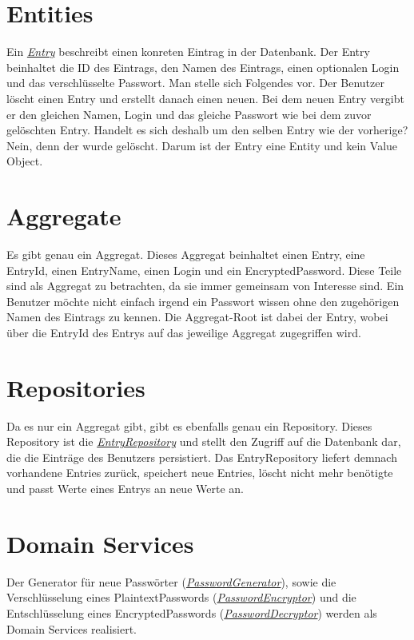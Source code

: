 \section{Entities}
Ein \href{https://github.com/moorts/Morik/blob/main/src/application/DDD/Entry.h}{\textit{Entry}} beschreibt einen konreten Eintrag in der Datenbank. Der Entry beinhaltet die ID des Eintrags, den Namen des Eintrags, einen optionalen Login und das verschlüsselte Passwort. Man stelle sich Folgendes vor. Der Benutzer löscht einen Entry und erstellt danach einen neuen. Bei dem neuen Entry vergibt er den gleichen Namen, Login und das gleiche Passwort wie bei dem zuvor gelöschten Entry. Handelt es sich deshalb um den selben Entry wie der vorherige? Nein, denn der wurde gelöscht. Darum ist der Entry eine Entity und kein Value Object.

\section{Aggregate}
Es gibt genau ein Aggregat. Dieses Aggregat beinhaltet einen Entry, eine EntryId, einen EntryName, einen Login und ein EncryptedPassword. Diese Teile sind als Aggregat zu betrachten, da sie immer gemeinsam von Interesse sind. Ein Benutzer möchte nicht einfach irgend ein Passwort wissen ohne den zugehörigen Namen des Eintrags zu kennen. Die Aggregat-Root ist dabei der Entry, wobei über die EntryId des Entrys auf das jeweilige Aggregat zugegriffen wird.

\section{Repositories}
Da es nur ein Aggregat gibt, gibt es ebenfalls genau ein Repository. Dieses Repository ist die \href{https://github.com/moorts/Morik/blob/main/src/application/DDD/EntryRepository.h}{\textit{EntryRepository}} und stellt den Zugriff auf die Datenbank dar, die die Einträge des Benutzers persistiert. Das EntryRepository liefert demnach vorhandene Entries zurück, speichert neue Entries, löscht nicht mehr benötigte und passt Werte eines Entrys an neue Werte an.

\section{Domain Services}
Der Generator für neue Passwörter (\href{https://github.com/moorts/Morik/blob/main/src/application/DDD/PasswordGenerator.h}{\textit{PasswordGenerator}}), sowie die Verschlüsselung eines PlaintextPasswords (\href{https://github.com/moorts/Morik/blob/main/src/application/DDD/PasswordEncryption.h#L11}{\textit{PasswordEncryptor}}) und die Entschlüsselung eines EncryptedPasswords (\href{https://github.com/moorts/Morik/blob/main/src/application/DDD/PasswordEncryption.h#L22}{\textit{PasswordDecryptor}}) werden als Domain Services realisiert.
